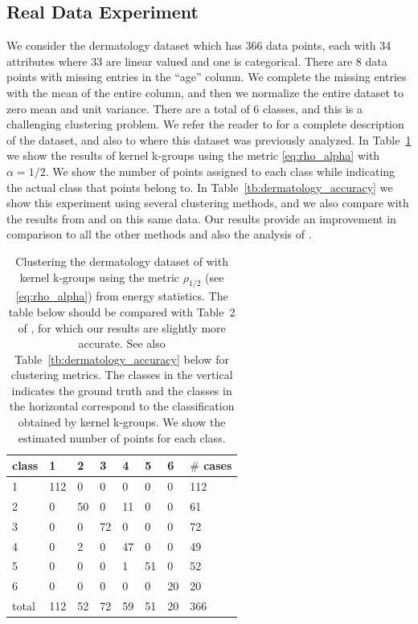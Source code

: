 \documentclass[10pt,journal,compsoc]{IEEEtran}
\begin{document}
\subsection{Real Data Experiment}

We consider the dermatology dataset \cite{Dua2017,Guvenir1998}
which has 366 data points, each with 34 attributes where 33 are
linear valued and one is categorical. There are 8 data points with
missing entries in the ``age'' column. We complete the missing entries
with the mean of the entire column, and then we normalize the entire
dataset to zero mean and unit variance. There are  a total of $6$ classes,
and this is a challenging clustering problem. We refer the reader
to \cite{Dua2017,Guvenir1998} for a complete description of the dataset, 
and also to \cite{RizzoClustering} where this dataset was previously
analyzed. In Table~\ref{tb:dermatology} we show the results of kernel
k-groups using the metric \eqref{eq:rho_alpha} with $\alpha=1/2$.
We show the number of points assigned to each class while indicating
the actual class that points belong to. In Table~\ref{tb:dermatology_accuracy}
we show this experiment using several clustering methods, and we also
compare with the results from \cite{RizzoClustering} and \cite{Kgroups}
on this same data. Our results provide an improvement in comparison
to all the other methods and also the analysis
of \cite{RizzoClustering}.

\begin{table}
\caption{
\label{tb:dermatology}
Clustering the dermatology 
dataset of \cite{Dua2017,Guvenir1998} with kernel k-groups
using the metric $\rho_{1/2}$ (see \eqref{eq:rho_alpha}) from energy
statistics. The table below should be compared with Table~2 of
\cite{RizzoClustering}, for which our results are slightly more accurate.
See also Table~\ref{tb:dermatology_accuracy} below for clustering metrics.
The classes in the vertical indicates the ground truth and the classes
in the horizontal correspond to the classification
obtained by kernel k-groups. We show the estimated number of points
for each class.
}
\centering
\begin{tabular}{@{}l|llllll|l@{}}
class & 1 & 2 & 3 & 4 & 5 & 6 & $\#$ cases \\ \midrule[.5pt]
   1   & 112 & 0  & 0  & 0  & 0  & 0  &  112  \\
   2   &  0  & 50 & 0  & 11 & 0  & 0  &   61  \\
   3   &  0  & 0  & 72 & 0  & 0  & 0  &   72  \\
   4   &  0  & 2  & 0  & 47 & 0  & 0  &   49  \\
   5   &  0  & 0  & 0  & 1  & 51 & 0  &   52  \\
   6   &  0  & 0  & 0  & 0  & 0  & 20 &   20  \\ \midrule[.5pt]
total & 112 & 52 & 72 & 59 & 51 & 20 &  366 %
\end{tabular}
\end{table}
\end{document}
